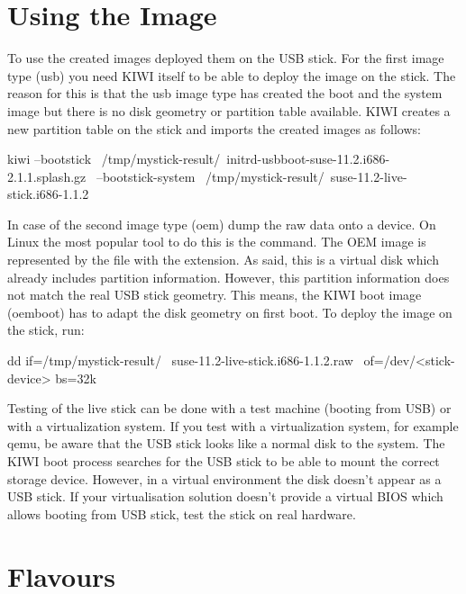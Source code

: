 \section{Using the Image}

To use the created images deployed them on the USB stick. 
For the first image type (usb) you need KIWI itself to
be able to deploy the image on the stick. The reason for this is
that the usb image type has created the boot and the system image
but there is no disk geometry or partition table available. KIWI
creates a new partition table on the stick and imports the created
images as follows:

\begin{Command}{13cm}
kiwi --bootstick \
   /tmp/mystick-result/\
   initrd-usbboot-suse-11.2.i686-2.1.1.splash.gz \
   --bootstick-system \
   /tmp/mystick-result/\
   suse-11.2-live-stick.i686-1.1.2
\end{Command}

In case of the second image type (oem) dump the raw data onto a device. 
On Linux the most popular tool to do this
is the \cmd{dd} command. The OEM image is represented by the file
with the  extension. As said, this is a virtual disk which already
includes partition information. However, this partition information does
not match the real USB stick geometry. This means, the KIWI boot image
(oemboot) has to adapt the disk geometry on first boot. To deploy the
image on the stick, run:

\begin{Command}{13cm}
dd if=/tmp/mystick-result/ \
   suse-11.2-live-stick.i686-1.1.2.raw \
   of=/dev/<stick-device> bs=32k
\end{Command}

Testing of the live stick can be done with a test machine (booting from USB)
or with a virtualization system. If you test with a virtualization
system, for example qemu, be aware that the USB stick looks like
a normal disk to the system. The KIWI boot process searches for the USB
stick to be able to mount the correct storage device. However, in a virtual
environment the disk doesn't appear as a USB stick. If your
virtualisation solution doesn't provide a virtual BIOS which allows booting
from USB stick, test the stick on real hardware.

\section{Flavours}

